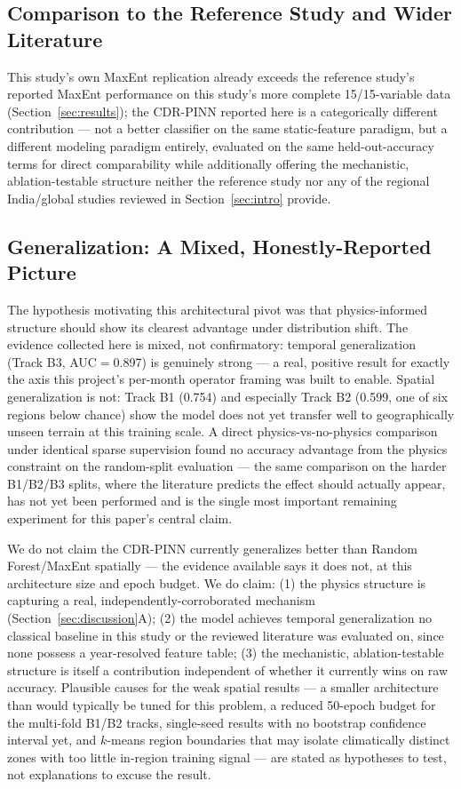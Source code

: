 \documentclass[journal]{IEEEtran}
\begin{document}
\subsection{Comparison to the Reference Study and Wider Literature}

This study's own MaxEnt replication already exceeds the reference study's reported MaxEnt performance on this study's more complete 15/15-variable data (Section~\ref{sec:results}); the CDR-PINN reported here is a categorically different contribution --- not a better classifier on the same static-feature paradigm, but a different modeling paradigm entirely, evaluated on the same held-out-accuracy terms for direct comparability while additionally offering the mechanistic, ablation-testable structure neither the reference study nor any of the regional India/global studies reviewed in Section~\ref{sec:intro} provide.

\subsection{Generalization: A Mixed, Honestly-Reported Picture}

The hypothesis motivating this architectural pivot was that physics-informed structure should show its clearest advantage under distribution shift. The evidence collected here is mixed, not confirmatory: temporal generalization (Track B3, AUC$=$0.897) is genuinely strong --- a real, positive result for exactly the axis this project's per-month operator framing was built to enable. Spatial generalization is not: Track B1 (0.754) and especially Track B2 (0.599, one of six regions below chance) show the model does not yet transfer well to geographically unseen terrain at this training scale. A direct physics-vs-no-physics comparison under identical sparse supervision found no accuracy advantage from the physics constraint on the random-split evaluation --- the same comparison on the harder B1/B2/B3 splits, where the literature predicts the effect should actually appear, has not yet been performed and is the single most important remaining experiment for this paper's central claim.

We do not claim the CDR-PINN currently generalizes better than Random Forest/MaxEnt spatially --- the evidence available says it does not, at this architecture size and epoch budget. We do claim: (1) the physics structure is capturing a real, independently-corroborated mechanism (Section~\ref{sec:discussion}A); (2) the model achieves temporal generalization no classical baseline in this study or the reviewed literature was evaluated on, since none possess a year-resolved feature table; (3) the mechanistic, ablation-testable structure is itself a contribution independent of whether it currently wins on raw accuracy. Plausible causes for the weak spatial results --- a smaller architecture than would typically be tuned for this problem, a reduced 50-epoch budget for the multi-fold B1/B2 tracks, single-seed results with no bootstrap confidence interval yet, and $k$-means region boundaries that may isolate climatically distinct zones with too little in-region training signal --- are stated as hypotheses to test, not explanations to excuse the result.
\end{document}
